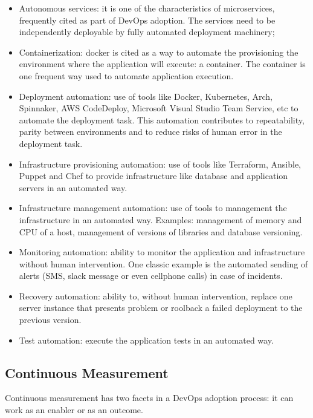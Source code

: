 \begin{itemize}
\item Autonomous services: it is one of the characteristics of microservices,
frequently cited as part of DevOps adoption. The services need to be
independently deployable by fully automated deployment machinery;

\item Containerization: docker is cited as a way to automate the provisioning
the environment where the application will execute: a container. The container
is one frequent way used to automate application execution.

\item Deployment automation: use of tools like Docker, Kubernetes, Arch,
Spinnaker, AWS CodeDeploy, Microsoft Visual Studio Team Service, etc to
automate the deployment task. This automation contributes to repeatability,
parity between environments and to reduce risks of human error in the
deployment task.

\item Infrastructure provisioning automation: use of tools like Terraform,
Ansible, Puppet and Chef to provide infrastructure like database and
application servers in an automated way.

\item Infrastructure management automation: use of tools to management the
infrastructure in an automated way. Examples: management of memory and CPU of
a host, management of versions of libraries and database versioning.

\item Monitoring automation: ability to monitor the application and
infrastructure without human intervention. One classic example is the
automated sending of alerts (SMS, slack message or even cellphone calls) in
case of incidents.

\item Recovery automation: ability to, without human intervention, replace one server instance that presents problem or roolback a failed deployment to the previous version.

\item Test automation: execute the application tests in an automated way.
\end{itemize}

\subsection{Continuous Measurement}
Continuous measurement has two facets in a DevOps adoption process: it can work as an enabler or as an outcome.

